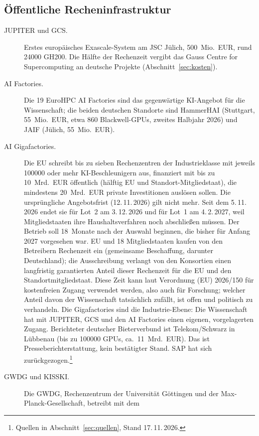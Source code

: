 \documentclass[a4paper,11pt]{article}
\begin{document}
\subsection{Öffentliche Recheninfrastruktur}

\begin{description}
\item[JUPITER und GCS.] Erstes europäisches Exascale-System am JSC
  Jülich, 500~Mio.\ EUR, rund \num{24000} GH200. Die Hälfte der
  Rechenzeit vergibt das Gauss Centre for Supercomputing an deutsche
  Projekte (Abschnitt~\ref{sec:kosten}).
\item[AI Factories.] Die 19 EuroHPC AI Factories sind das
  gegenwärtige KI-Angebot für die Wissenschaft; die beiden deutschen
  Standorte sind HammerHAI (Stuttgart, 55~Mio.\ EUR, etwa 860
  Blackwell-GPUs, zweites Halbjahr 2026) und JAIF (Jülich,
  55~Mio.\ EUR).
\item[AI Gigafactories.] Die EU schreibt bis zu sieben
  Rechenzentren der Industrieklasse mit jeweils \num{100000} oder mehr
  KI-Beschleunigern aus, finanziert mit bis zu 10~Mrd.\ EUR öffentlich
  (hälftig EU und Standort-Mitgliedstaat), die mindestens
  20~Mrd.\ EUR private Investitionen auslösen sollen. Die
  ursprüngliche Angebotsfrist (12.\,11.\,2026) gilt nicht mehr.  Seit
  dem 5.\,11.\,2026 endet sie für Lot~2 am 3.\,12.\,2026 und für
  Lot~1 am 4.\,2.\,2027, weil Mitgliedstaaten ihre Haushaltsverfahren
  noch abschließen müssen.  Der Betrieb soll 18~Monate nach der
  Auswahl beginnen, die bisher für Anfang 2027 vorgesehen war. EU und
  18 Mitgliedstaaten kaufen von den Betreibern Rechenzeit ein
  (gemeinsame Beschaffung, darunter Deutschland); die Ausschreibung
  verlangt von den Konsortien einen langfristig garantierten Anteil
  dieser Rechenzeit für die EU und den Standortmitgliedstaat. Diese
  Zeit kann laut Verordnung (EU) 2026/150 für kostenfreien Zugang
  verwendet werden, also auch für Forschung; welcher Anteil davon der
  Wissenschaft tatsächlich zufällt, ist offen und politisch zu
  verhandeln. Die Gigafactories sind die Industrie-Ebene: Die
  Wissenschaft hat mit JUPITER, GCS und den AI Factories einen
  eigenen, vorgelagerten Zugang. Berichteter deutscher Bieterverbund
  ist Telekom/Schwarz in Lübbenau (bis zu \num{100000} GPUs, ca.\
  11~Mrd.\ EUR).  Das ist Presseberichterstattung, kein bestätigter
  Stand.  SAP hat sich zurückgezogen.\footnote{Quellen in
  Abschnitt~\ref{sec:quellen}, Stand 17.\,11.\,2026.}
\item[GWDG und KISSKI.] Die GWDG, Rechenzentrum der Universität
  Göttingen und der Max-Planck-Gesellschaft, betreibt mit dem

\end{description}
\end{document}
